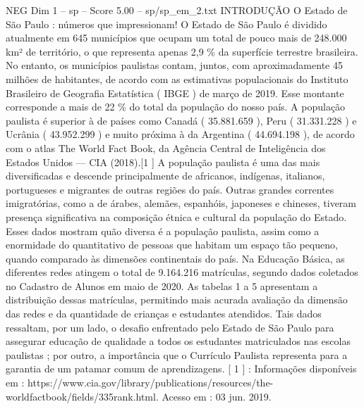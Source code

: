 \begin{textsample}{NEG Dim 1 – sp – Score 5.00 – sp/sp\_em\_2.txt}  \label{ex:f1_neg_173}
INTRODUÇÃO O Estado de São Paulo : números que impressionam!
O Estado de São Paulo é dividido atualmente em 645 municípios que ocupam um total de pouco mais de 248.000 km² de território, o que representa apenas 2,9 \% da superfície terrestre brasileira.
No entanto, os municípios paulistas contam, juntos, com aproximadamente 45 milhões de habitantes, de acordo com as estimativas populacionais do Instituto Brasileiro de Geografia Estatística ( IBGE ) de março de 2019.
Esse montante corresponde a mais de 22 \% do total da população do nosso país.
A população paulista é superior à de países como Canadá ( 35.881.659 ), Peru ( 31.331.228 ) e Ucrânia ( 43.952.299 ) e muito próxima à da Argentina ( 44.694.198 ), de acordo com o atlas The World Fact Book, da Agência Central de Inteligência dos Estados Unidos — CIA (2018).[1 ] A população paulista é uma das mais diversificadas e descende principalmente de africanos, indígenas, italianos, portugueses e migrantes de outras regiões do país.
Outras grandes correntes imigratórias, como a de árabes, alemães, espanhóis, japoneses e chineses, tiveram presença significativa na composição étnica e cultural da população do Estado.
Esses dados mostram quão diversa é a população paulista, assim como a enormidade do quantitativo de pessoas que habitam um espaço tão pequeno, quando comparado às dimensões continentais do país.
Na Educação Básica, as diferentes redes atingem o total de 9.164.216 matrículas, segundo dados coletados no Cadastro de Alunos em maio de 2020.
As tabelas 1 a 5 apresentam a distribuição dessas matrículas, permitindo mais acurada avaliação da dimensão das redes e da quantidade de crianças e estudantes atendidos.
Tais dados ressaltam, por um lado, o desafio enfrentado pelo Estado de São Paulo para assegurar educação de qualidade a todos os estudantes matriculados nas escolas paulistas ; por outro, a importância que o Currículo Paulista representa para a garantia de um patamar comum de aprendizagens. [ 1 ] : Informações disponíveis em : https://www.cia.gov/library/publications/resources/the-worldfactbook/fields/335rank.html.
Acesso em : 03 jun. 2019.

\end{textsample}
